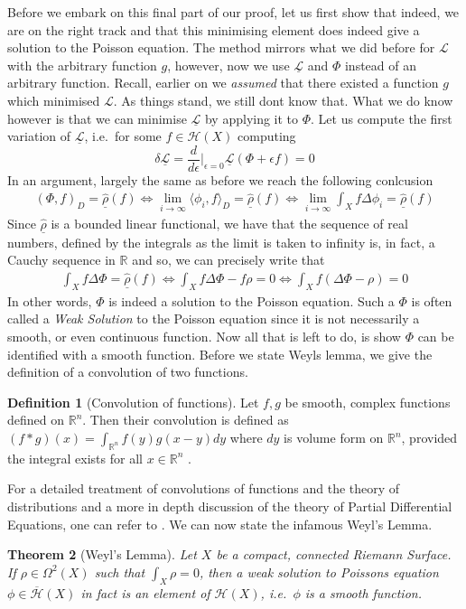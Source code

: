 \documentclass[11pt]{report}
\newtheorem{thm}{Theorem}[section]
\theoremstyle{definition}
\newtheorem{defn}[thm]{Definition}
\begin{document}
Before we embark on this final part of our proof, let us first show that indeed, we are on the right track and that this minimising element does indeed give a solution to the Poisson equation. The method mirrors what we did before for $\mathcal{L}$ with the arbitrary function $g$, however, now we use $\underline{\mathcal{L}}$ and $\Phi$ instead of an arbitrary function. Recall, earlier on we \emph{assumed} that there existed a function $g$ which minimised $\mathcal{L}$. As things stand, we still dont know that. What we do know however is that we can minimise $\underline{\mathcal{L}}$ by applying it to $\Phi$. Let us compute the first variation of $\underline{\mathcal{L}}$, i.e.\ for some $f\in \mathcal{H}(X)$ computing
 \[ \delta\underline{\mathcal{L}} =  \frac{d}{d\epsilon}\biggr\rvert_{\epsilon = 0} \underline{\mathcal{L}}(\Phi + \epsilon f) = 0\]
In an argument, largely the same as before we reach the following conlcusion
\begin{align*}
  (\Phi,f)_D = \underline{\hat{\rho}}(f) \Longleftrightarrow
  \lim_{i \rightarrow \infty}\langle \phi_i,f\rangle_D = \underline{\hat{\rho}}(f) \Longleftrightarrow
  \lim_{i \rightarrow \infty}\int_X f \Delta \phi_i = \underline{\hat{\rho}}(f) 
\end{align*}
Since $\underline{\hat{\rho}}$ is a bounded linear functional, we have that the sequence of real numbers, defined by the integrals as the limit is taken to infinity is, in fact, a Cauchy sequence in $\mathbb{R}$ and so, we can precisely write that 
\begin{align*} 
  \int_X f\Delta\Phi = \underline{\hat{\rho}}(f) \Longleftrightarrow
  \int_X f\Delta\Phi - f\rho = 0 \Longleftrightarrow
  \int_X f(\Delta\Phi - \rho) = 0
\end{align*}
In other words, $\Phi$ is indeed a solution to the Poisson equation. Such a $\Phi$ is often called a \emph{Weak Solution} to the Poisson equation since it is not necessarily a smooth, or even continuous function.
Now all that is left to do, is show $\Phi$ can be identified with a smooth function. Before we state Weyls lemma, we give the definition of a convolution of two functions.
\begin{defn}[Convolution of functions]\label{ConvolutionDefn}
  Let $f,g$ be smooth, complex functions defined on $\mathbb{R}^n$. Then their convolution is defined as $(f * g)(x) = \int_{\mathbb{R}^n}f(y)g(x-y)dy$ where $dy$ is volume form on $\mathbb{R}^n$, provided the integral exists for all $x \in \mathbb{R}^n$ .
\end{defn}
For a detailed treatment of convolutions of functions and the theory of distributions and a more in depth discussion of the theory of Partial Differential Equations, one can refer to \cite[Chapter 6]{rudin}. We can now state the infamous Weyl's Lemma.
\begin{thm}[Weyl's Lemma]\label{WeylsLemmaCompact}
  Let $X$ be a compact, connected Riemann Surface. If $\rho \in \Omega^2(X)$ such that $\int_X \rho = 0$, then a weak solution to Poissons equation $\phi \in \overline{\mathcal{H}}(X)$ in fact is an element of $\mathcal{H}(X)$, i.e.\ $\phi$ is a smooth function.
\end{thm}
\end{document}
